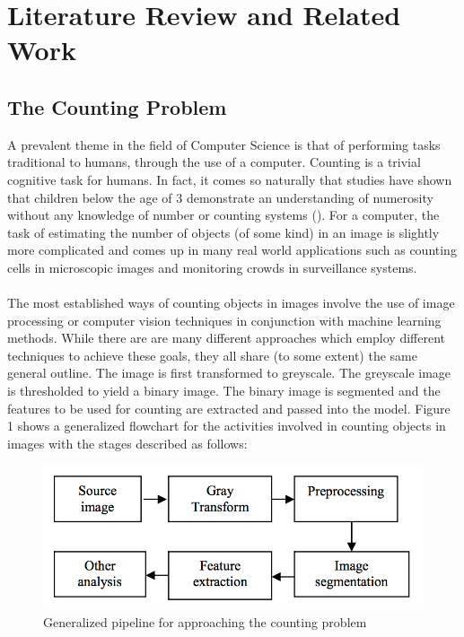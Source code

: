 \def\baselinestretch{1}

\chapter{Literature Review and Related Work}

\def\baselinestretch{1.66}




\smallskip

\goodbreak
\section{The Counting Problem}
A prevalent theme in the field of Computer Science is that of performing tasks traditional to humans, through the use of a computer. Counting is a trivial cognitive task for humans. In fact, it comes so naturally that studies have shown that children below the age of 3 demonstrate an understanding of numerosity without any knowledge of number or counting systems (\cite{REF1}). For a computer, the task of estimating the number of objects (of some kind) in an image is slightly more complicated and comes up in many real world applications such as counting cells in microscopic images and monitoring crowds in surveillance systems.\\ \\
%
The most established ways of counting objects in images involve the use of image processing or computer vision techniques in conjunction with machine learning methods. While there are are many different approaches which employ different techniques to achieve these goals, they all share (to some extent) the same general outline. The image is first transformed to greyscale. The greyscale image is thresholded to yield a binary image. The binary image is segmented and the features to be used for counting are extracted and passed into the model. Figure 1 shows a generalized flowchart for the activities involved in counting objects in images with the stages described as follows:\\
\begin{figure}[ht!]
\centering
\includegraphics[scale=0.5]{Images/general_pipeline}
\caption{Generalized pipeline for approaching the counting problem}
\label{fig:columnfigure}
\end{figure}

